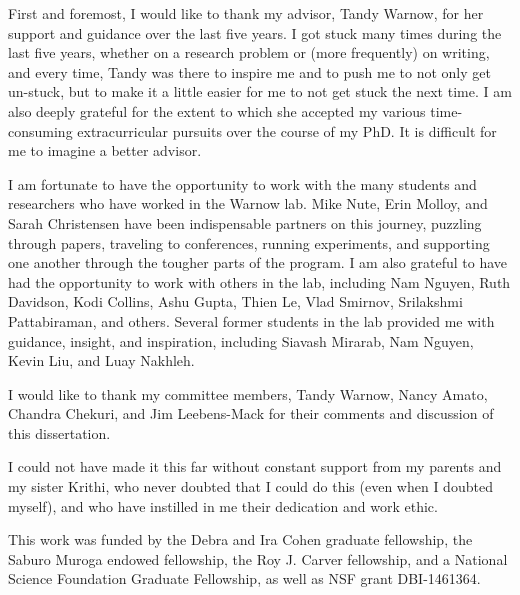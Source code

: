 \documentclass[tocnosub,noragright,centerchapter,fullpagesingle,12pt]{uiuc_csthesis18}
\begin{document}
%

%
\begin{acknowledgments}

First and foremost, I would like to thank my advisor, Tandy Warnow, for her support and guidance over the last five years. I got stuck many times during the last five years, whether on a research problem or (more frequently) on writing, and every time, Tandy was there to inspire me and to push me to not only get un-stuck, but to make it a little easier for me to not get stuck the next time. I am also deeply grateful for the extent to which she accepted my various time-consuming extracurricular pursuits over the course of my PhD. It is difficult for me to imagine a better advisor.

I am fortunate to have the opportunity to work with the many students and researchers who have worked in the Warnow lab. Mike Nute, Erin Molloy, and Sarah Christensen have been indispensable partners on this journey, puzzling through papers, traveling to conferences, running experiments, and supporting one another through the tougher parts of the program. I am also grateful to have had the opportunity to work with others in the lab, including Nam Nguyen, Ruth Davidson, Kodi Collins, Ashu Gupta, Thien Le, Vlad Smirnov, Srilakshmi Pattabiraman, and others. Several former students in the lab provided me with guidance, insight, and inspiration, including Siavash Mirarab, Nam Nguyen, Kevin Liu, and Luay Nakhleh.

I would like to thank my committee members, Tandy Warnow, Nancy Amato, Chandra Chekuri, and Jim Leebens-Mack for their comments and discussion of this dissertation.

I could not have made it this far without constant support from my parents and my sister Krithi, who never doubted that I could do this (even when I doubted myself), and who have instilled in me their dedication and work ethic.

This work was funded by the Debra and Ira Cohen graduate fellowship, the Saburo Muroga endowed fellowship, the Roy J. Carver fellowship, and a National Science Foundation Graduate Fellowship, as well as NSF grant DBI-1461364.

\end{acknowledgments}
\end{document}
